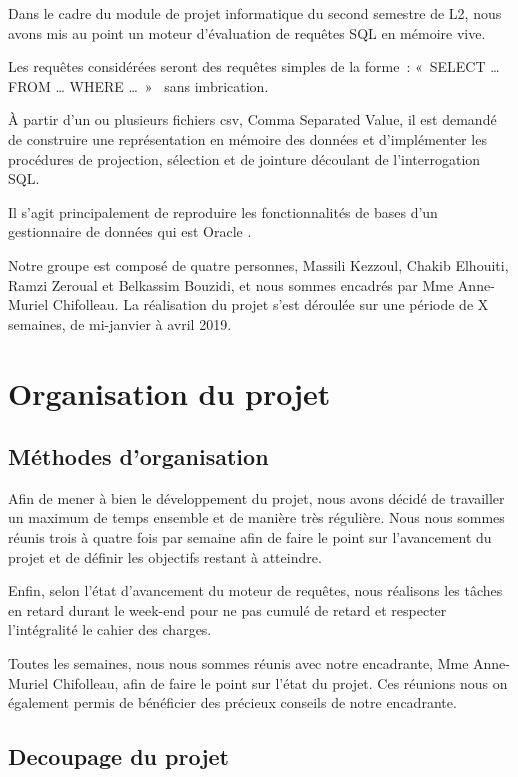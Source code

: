 \documentclass[oneside,13pt,a4paper]{report}
\begin{document}
        Dans le cadre du module de projet informatique du second semestre de L2, nous avons mis au point un moteur d’évaluation de requêtes SQL en mémoire vive.

        Les requêtes considérées seront des requêtes simples de la forme : « SELECT … FROM … WHERE … »  sans imbrication.

        À partir d’un ou plusieurs fichiers csv, Comma Separated Value, il est demandé de construire une représentation en mémoire des données et d’implémenter les procédures de projection, sélection et de jointure découlant de l’interrogation SQL.

        Il s’agit principalement de reproduire les fonctionnalités de bases d’un gestionnaire de données qui est Oracle .

        Notre groupe est composé de quatre personnes, Massili Kezzoul, Chakib Elhouiti, Ramzi Zeroual et Belkassim Bouzidi, et nous sommes encadrés par Mme Anne-Muriel Chifolleau. La réalisation du projet s’est déroulée sur une période de X semaines, de mi-janvier à avril 2019.


    \chapter{Organisation du projet}
        \section{Méthodes d’organisation}

            Afin de mener à bien le développement du projet, nous avons décidé de travailler un maximum de temps ensemble et de manière très régulière. Nous nous sommes réunis trois à quatre fois par semaine afin de faire le point sur l’avancement du projet et de définir les objectifs restant à atteindre.

            Enfin, selon l’état d’avancement du moteur de requêtes, nous réalisons les tâches en retard durant le week-end pour ne pas cumulé de retard et respecter l’intégralité le cahier des charges.

            Toutes les semaines, nous nous sommes réunis avec notre encadrante, Mme Anne-Muriel Chifolleau, afin de faire le point sur l’état du projet. Ces réunions nous on également permis de bénéficier des précieux conseils de notre encadrante.

        \section{Decoupage du projet}
\end{document}
